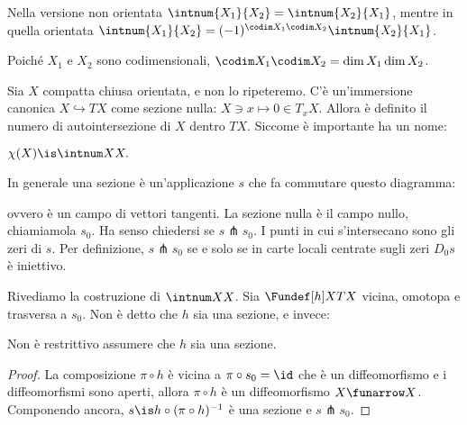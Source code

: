 \begin{oss}
	Nella versione non orientata $\intnum{X_1}{X_2}=\intnum{X_2}{X_1}$, mentre in quella orientata $\intnum{X_1}{X_2}=(-1)^{\codim X_1\codim X_2}\intnum{X_2}{X_1}$.
\end{oss}

\begin{oss}
	Poiché $X_1$ e $X_2$ sono codimensionali, $\codim X_1\codim X_2=\dim X_1\dim X_2$.
\end{oss}


Sia $X$ compatta chiusa orientata, e non lo ripeteremo.
C'è un'immersione canonica $X\hookrightarrow TX$ come sezione nulla: $X\ni x\mapsto 0\in T_xX$.
Allora è definito il numero di autointersezione di $X$ dentro $TX$.
Siccome è importante ha un nome:

\begin{defn}
	$\chi(X)\is\intnum XX.$
\end{defn}

In generale una sezione è un'applicazione $s$ che fa commutare questo diagramma:
\begin{center}
\end{center}
ovvero è un campo di vettori tangenti.
La sezione nulla è il campo nullo, chiamiamola $s_0$.
Ha senso chiedersi se $s\pitchfork s_0$.
I punti in cui s'intersecano sono gli zeri di $s$.
Per definizione, $s\pitchfork s_0$ se e solo se in carte locali centrate sugli zeri $D_0s$ è iniettivo.

Rivediamo la costruzione di $\intnum XX$.
Sia $\Fundef[h]X{TX}$ vicina, omotopa e trasversa a $s_0$.
Non è detto che $h$ sia una sezione, e invece:

\begin{lemma}
	Non è restrittivo assumere che $h$ sia una sezione.
\end{lemma}

\begin{proof}
	La composizione $\pi\circ h$ è vicina a $\pi\circ s_0=\id$ che è un diffeomorfismo e i diffeomorfismi sono aperti, allora \wlg $\pi\circ h$ è un diffeomorfismo $X\funarrow X$.
	Componendo ancora, $s\is h\circ(\pi\circ h)^{-1}$ è una sezione e $s\pitchfork s_0$\footnotemark.
\end{proof}

